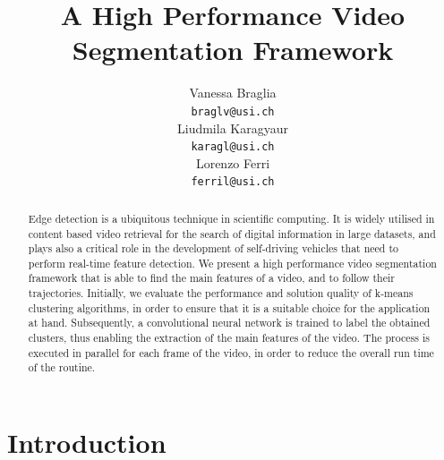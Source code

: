 \documentclass{article}
\title{A High Performance Video Segmentation Framework }
\author{
  Vanessa Braglia \\
  \texttt{braglv@usi.ch} \\
   \And
 Liudmila Karagyaur \\
  \texttt{karagl@usi.ch} \\
     \And
  Lorenzo Ferri \\
  \texttt{ferril@usi.ch} \\
}
\begin{document}
{\selectfont
\maketitle

\begin{abstract}
Edge detection is a ubiquitous technique in scientific computing. It is widely utilised in content based video retrieval for the search of digital information in large datasets, and plays also a critical role in the development of self-driving vehicles that need to perform real-time feature detection.
We present a high performance video segmentation framework that is able to find the main features of a video, and to follow their trajectories. Initially, we evaluate the performance and solution quality of k-means clustering algorithms, in order to ensure that it is a suitable choice for the application at hand. Subsequently, a convolutional neural network is trained to label the obtained clusters, thus enabling the extraction of the main features of the video. The process is executed in parallel for each frame of the video, in order to reduce the overall run time of the routine.
\end{abstract}



\large
\section{Introduction}

}
\end{document}
